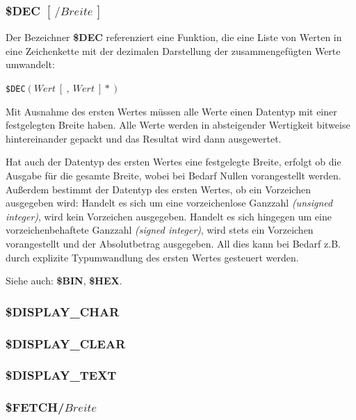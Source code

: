 \documentclass{scrartcl}
\begin{document}
\subsubsection{\$DEC $[~/Breite~]$}

\noindent Der Bezeichner \textbf{\$DEC} referenziert eine Funktion, die eine Liste von Werten in eine Zeichenkette mit der dezimalen Darstellung der zusammengefügten Werte umwandelt:

\vspace{10pt}
\texttt{\$DEC$(Wert~[~,~Wert~]*)$}

\vspace{10pt}
\noindent Mit Ausnahme des ersten Wertes müssen alle Werte einen Datentyp mit einer festgelegten Breite haben. Alle Werte werden in absteigender Wertigkeit bitweise hintereinander gepackt und das Resultat wird dann ausgewertet.

\vspace{10pt}
\noindent Hat auch der Datentyp des ersten Wertes eine festgelegte Breite, erfolgt ob die Ausgabe für die gesamte Breite, wobei bei Bedarf Nullen vorangestellt werden. Außerdem bestimmt der Datentyp des ersten Wertes, ob ein Vorzeichen ausgegeben wird: Handelt es sich um eine vorzeichenlose Ganzzahl \textit{(unsigned integer)}, wird kein Vorzeichen ausgegeben. Handelt es sich hingegen um eine vorzeichenbehaftete Ganzzahl \textit{(signed integer)}, wird stets ein Vorzeichen vorangestellt und der Absolutbetrag ausgegeben. All dies kann bei Bedarf z.B. durch explizite Typumwandlung des ersten Wertes gesteuert werden.

\vspace{10pt}
\noindent Siehe auch: \textbf{\$BIN}, \textbf{\$HEX}.

\subsubsection{\$DISPLAY\_CHAR}

\subsubsection{\$DISPLAY\_CLEAR}

\subsubsection{\$DISPLAY\_TEXT}

\subsubsection{\$FETCH/$Breite$}
\end{document}
